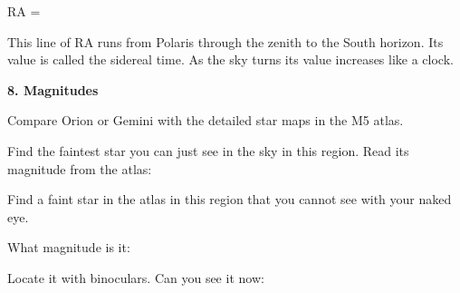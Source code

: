 \medskip
{\hfill RA = \makebox[4cm]{\hrulefill} \hfill }

\medskip
This line of RA runs from Polaris through the zenith to the South
horizon. Its value is called the sidereal time. As the sky turns its
value increases like a clock. 

\bigskip\noindent
{\bf 8. Magnitudes}

\bigskip\noindent Compare Orion
or Gemini with the detailed star maps
in the M5 atlas.

Find the faintest star you can just see in the sky in this region. Read its
magnitude from the atlas:  \makebox[4cm]{\hrulefill}

\smallskip\noindent
Find a faint star in the atlas in this region that you cannot see with
your naked eye.
 
What magnitude is it: \makebox[4cm]{\hrulefill}
 
Locate it with binoculars. Can you see it now: \makebox[4cm]{\hrulefill}


\newpage

\begin{figure*}[h]
        \centerline{}
        \caption{}
         \end{figure*}









